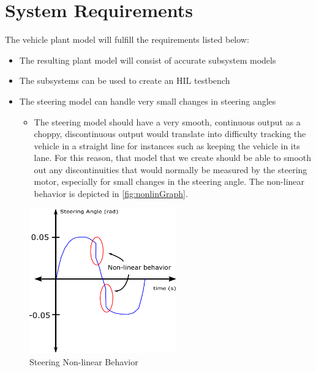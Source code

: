 \documentclass[letterpaper,12pt]{article}   %
\begin{document}
\section{System Requirements}
The vehicle plant model will fulfill the requirements listed below:
\begin{itemize}
    \item The resulting plant model will consist of accurate subsystem models
    \item The subsystems can be used to create an HIL testbench
    \item The steering model can handle very small changes in steering angles
    \begin{itemize}
    		\item The steering model should have a very smooth, continuous output as a choppy, discontinuous output would translate into difficulty tracking the vehicle in a straight line for instances such as keeping the vehicle in its lane. For this reason, that model that we create should be able to smooth out any discontinuities that would normally be measured by the steering motor, especially for small changes in the steering angle. The non-linear behavior is depicted in \autoref{fig:nonlinGraph}.
    \end{itemize}
\end{itemize}
\begin{figure}[h]
    \centering
    \captionsetup{justification=centering, margin=3cm}
    \includegraphics[width=2.5in]{figs/inkscape/nonlinearBehavior}
    \caption{Steering Non-linear Behavior}
    \label{fig:nonlinGraph}
\end{figure}
\end{document}
